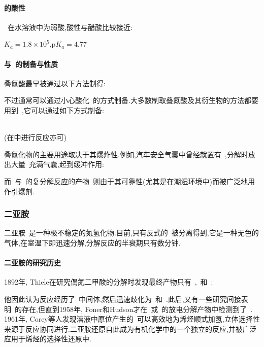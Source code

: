 \documentclass{ctexbook}
\begin{document}
\paragraph{的酸性}
~在水溶液中为弱酸,酸性与醋酸比较接近:
\begin{tightcenter}
    \quad$K_{a}=1.8\times10^5$,$\mathrm{p}K_{a}=4.77$
\end{tightcenter}
\paragraph{与~的制备与性质}
叠氮酸最早被通过以下方法制得:
\begin{tightcenter}
\end{tightcenter}
不过通常可以通过小心酸化~的方式制备.大多数制取叠氮酸及其衍生物的方法都要用到~,它可以通过如下方式制备:
\begin{tightcenter}
    \\
    (在中进行反应亦可)\\
\end{tightcenter}
叠氮化物的主要用途取决于其爆炸性.例如,汽车安全气囊中曾经就置有~,分解时放出大量~充满气囊,起到缓冲作用:
\begin{tightcenter}
\end{tightcenter}
而~与~的复分解反应的产物~则由于其可靠性(尤其是在潮湿环境中)而被广泛地用作引爆剂.
\subsubsection{二亚胺~}
二亚胺~是一种极不稳定的氮氢化物.目前,只有反式的~被分离得到,它是一种无色的气体,在室温下即迅速分解,分解反应的半衰期只有数分钟.
\paragraph{二亚胺的研究历史}
1892年, Thiele在研究偶氮二甲酸的分解时发现最终产物只有~,~和~\cite{Thiele1892}:
\begin{tightcenter}
\end{tightcenter}
他因此认为反应经历了~中间体,然后迅速歧化为~和~.此后,又有一些研究间接表明~的存在,但直到1958年, Foner和Hudson才在~或~的放电分解产物中检测到了~\cite{Foner1958}.\\
\indent 1961年, Corey等人发现溶液中原位产生的~可以高效地为烯烃顺式加氢\cite{Corey1961},立体选择性来源于反应协同进行.二亚胺还原自此成为有机化学中的一个独立的反应,并被广泛应用于烯烃的选择性还原中.
\end{document}
